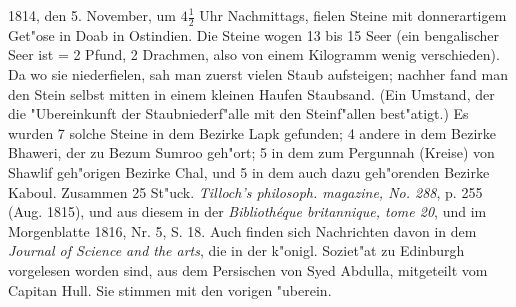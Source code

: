 \documentclass[a4paper, 11pt, oneside, polutonikogreek, german]{article}
\begin{document}
1814, den 5. November, um $\mathfrak{4\frac{1}{2}}$ Uhr Nachmittags, fielen Steine mit donnerartigem Get"ose in Doab in Ostindien. Die Steine wogen 13 bis 15 Seer (ein bengalischer Seer ist = 2 Pfund, 2 Drachmen, also von einem Kilogramm wenig verschieden). Da wo sie niederfielen, sah man zuerst vielen Staub aufsteigen; nachher fand man den Stein selbst mitten in einem kleinen Haufen Staubsand. (Ein Umstand, der die "Ubereinkunft der Staubniederf"alle mit den Steinf"allen best"atigt.) Es wurden 7 solche Steine in dem Bezirke Lapk gefunden; 4 andere in dem Bezirke Bhaweri, der zu Bezum Sumroo geh"ort; 5 in dem zum Pergunnah (Kreise) von Shawlif geh"origen Bezirke Chal, und 5 in dem auch dazu geh"orenden Bezirke Kaboul. Zusammen 25 St"uck. \emph{Tilloch's philosoph. magazine, No. 288}, p. 255 (Aug. 1815), und aus diesem in der \emph{Bibliothéque britannique, tome 20}, und im Morgenblatte 1816, Nr. 5, S. 18. Auch finden sich Nachrichten davon in dem \emph{Journal of Science and the arts}, die in der k"onigl. Soziet"at zu Edinburgh vorgelesen worden sind, aus dem Persischen von Syed Abdulla, mitgeteilt vom Capitan Hull. Sie stimmen mit den vorigen "uberein.
\end{document}
